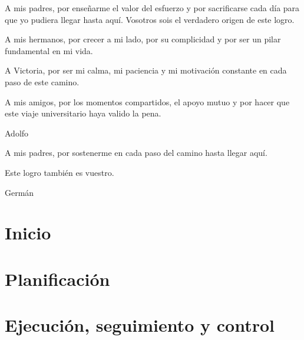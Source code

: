\documentclass[titlepage,openright,twoside,a4paper,draft,12pt,spanish]{book}
\author{Adolfo Agustín Borrego González}{Grado en Ingeniería Informática - Software}{D. }{29584665H}
\author{Germán Sánchez Carmona}{Grado en Ingeniería Informática - Software}{D. }{52077055H}
\begin{document}
\makeTitlePage

\pagestyle{empty}
\begin{dedication}
A mis padres, por enseñarme el valor del esfuerzo y por sacrificarse cada día para que yo pudiera llegar hasta aquí. Vosotros sois el verdadero origen de este logro.

A mis hermanos, por crecer a mi lado, por su complicidad y por ser un pilar fundamental en mi vida.

A Victoria, por ser mi calma, mi paciencia y mi motivación constante en cada paso de este camino.

A mis amigos, por los momentos compartidos, el apoyo mutuo y por hacer que este viaje universitario haya valido la pena.

Adolfo

\vspace{3cm}

A mis padres, por sostenerme en cada paso del camino hasta llegar aquí.

Este logro también es vuestro.

Germán
\end{dedication}
\pagestyle{trinidadPhD}




\tableofcontents
\listoffigures
\listoftables
\newpage



\lineNumbersOn
\part{Inicio}




\part{Planificación}





\part{Ejecución, seguimiento y control}








\end{document}
